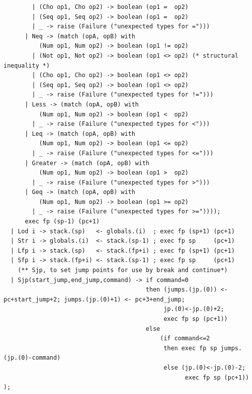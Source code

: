 \documentclass[12pt,A4]{book}
\begin{document}
\begin{verbatim}
		| (Cho op1, Cho op2) -> boolean (op1 =  op2)
		| (Seq op1, Seq op2) -> boolean (op1 =  op2)
        | _ -> raise (Failure ("unexpected types for =")))
      | Neq -> (match (opA, opB) with
          (Num op1, Num op2) -> boolean (op1 != op2)
		| (Not op1, Not op2) -> boolean (op1 <> op2) (* structural inequality *)
		| (Cho op1, Cho op2) -> boolean (op1 <> op2)
		| (Seq op1, Seq op2) -> boolean (op1 <> op2)
        | _ -> raise (Failure ("unexpected types for !=")))
      | Less -> (match (opA, opB) with 
          (Num op1, Num op2) -> boolean (op1 <  op2)
        | _ -> raise (Failure ("unexpected types for <")))
      | Leq -> (match (opA, opB) with 
          (Num op1, Num op2) -> boolean (op1 <= op2)
        | _ -> raise (Failure ("unexpected types for <=")))
      | Greater -> (match (opA, opB) with 
          (Num op1, Num op2) -> boolean (op1 >  op2)
        | _ -> raise (Failure ("unexpected types for >")))
      | Geq -> (match (opA, opB) with 
          (Num op1, Num op2) -> boolean (op1 >= op2)
        | _ -> raise (Failure ("unexpected types for >="))));
      exec fp (sp-1) (pc+1)
  | Lod i -> stack.(sp)   <- globals.(i)  ; exec fp (sp+1) (pc+1)
  | Str i -> globals.(i)  <- stack.(sp-1) ; exec fp sp     (pc+1)
  | Lfp i -> stack.(sp)   <- stack.(fp+i) ; exec fp (sp+1) (pc+1)
  | Sfp i -> stack.(fp+i) <- stack.(sp-1) ; exec fp sp     (pc+1)
    (** Sjp, to set jump points for use by break and continue*)
  | Sjp(start_jump,end_jump,command) -> if command=0 
                                        then (jumps.(jp.(0)) <- pc+start_jump+2; jumps.(jp.(0)+1) <- pc+3+end_jump;
                                             jp.(0)<-jp.(0)+2;
                                             exec fp sp (pc+1))
                                        else 
                                            (if command<=2  
                                             then exec fp sp jumps.(jp.(0)-command)
                                             else (jp.(0)<-jp.(0)-2; 
                                                   exec fp sp (pc+1)) ); 


\end{verbatim}
\end{document}
